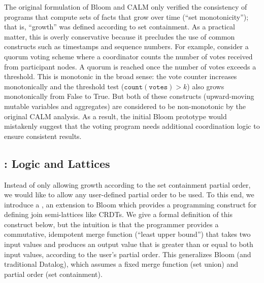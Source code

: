 The original formulation of Bloom and CALM only verified the consistency of
programs that compute sets of facts that grow over time (``set monotonicity'');
that is, ``growth'' was defined according to set containment. As a practical
matter, this is overly conservative because it precludes the use of common
constructs such as timestamps and sequence numbers. For example, consider a
quorum voting scheme where a coordinator counts the number of votes received
from participant nodes. A quorum is reached once the number of votes exceeds a
threshold. This is monotonic in the broad sense: the vote counter increases
monotonically and the threshold test ($\mathtt{count(votes)} > k$) also grows
monotonically from False to True. But both of these constructs (upward-moving
mutable variables and aggregates) are considered to be non-monotonic by the
original CALM analysis.  As a result, the initial Bloom prototype would
mistakenly suggest that the voting program needs additional coordination logic
to ensure consistent results.


\subsection{\lang: Logic and Lattices}
Instead of only allowing growth according to the set containment partial order,
we would like to allow any user-defined partial order to be used.  To this end,
we introduce a \lang, an extension to Bloom which provides a programming
construct for defining join semi-lattices like CRDTs.  We give a formal
definition of this construct below, but the intuition is that the programmer
provides a commutative, idempotent merge function (``least upper bound'') that
takes two input values and produces an output value that is greater than or
equal to both input values, according to the user's partial order. This
generalizes Bloom (and traditional Datalog), which assumes a fixed merge
function (set union) and partial order (set containment).


